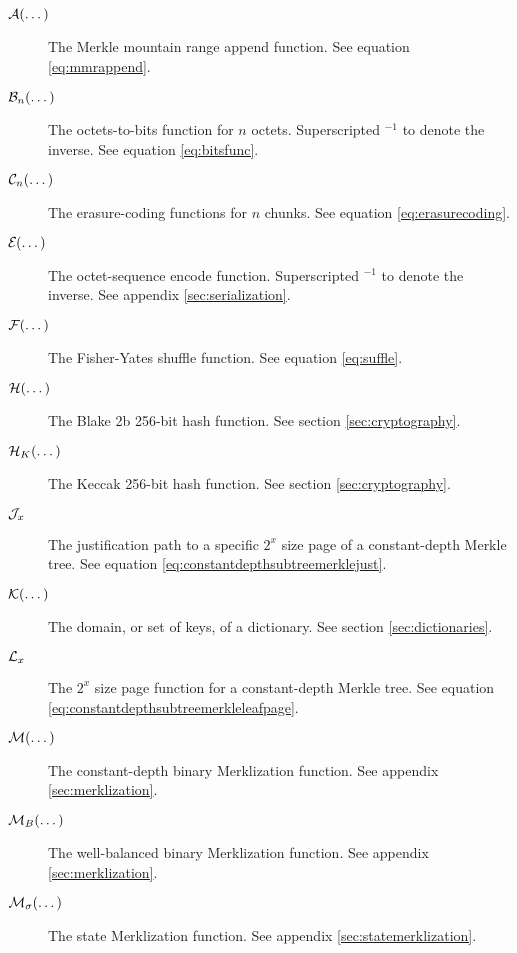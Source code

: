 \begin{description}
  \item[$\mathcal{A}(\dots)$] The Merkle mountain range append function. See equation \ref{eq:mmrappend}.
  \item[$\mathcal{B}_{n}(\dots)$] The octets-to-bits function for $n$ octets. Superscripted ${}^{-1}$ to denote the inverse. See equation \ref{eq:bitsfunc}.
  \item[$\mathcal{C}_{n}(\dots)$] The erasure-coding functions for $n$ chunks. See equation \ref{eq:erasurecoding}.
  \item[$\encode{\dots}$] The octet-sequence encode function. Superscripted ${}^{-1}$ to denote the inverse. See appendix \ref{sec:serialization}.
  \item[$\mathcal{F}(\dots)$] The Fisher-Yates shuffle function. See equation \ref{eq:suffle}.
  \item[$\blake{\dots}$] The Blake 2b 256-bit hash function. See section \ref{sec:cryptography}.
  \item[$\keccak{\dots}$] The Keccak 256-bit hash function. See section \ref{sec:cryptography}.
 
 
  \item[$\mathcal{J}_{x}$] The justification path to a specific $2^x$ size page of a constant-depth Merkle tree. See equation \ref{eq:constantdepthsubtreemerklejust}.
  \item[$\keys{\dots}$] The domain, or set of keys, of a dictionary. See section \ref{sec:dictionaries}.
  \item[$\mathcal{L}_{x}$] The $2^x$ size page function for a constant-depth Merkle tree. See equation \ref{eq:constantdepthsubtreemerkleleafpage}.
  \item[$\merklizecd{\dots}$] The constant-depth binary Merklization function. See appendix \ref{sec:merklization}.
  \item[$\merklizewb{\dots}$] The well-balanced binary Merklization function. See appendix \ref{sec:merklization}.
  \item[$\merklizestate{\dots}$] The state Merklization function. See appendix \ref{sec:statemerklization}.
 

\end{description}
